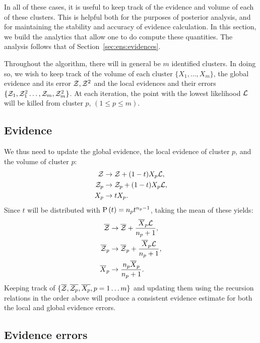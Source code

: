In all of these cases, it is useful to keep track of the evidence and volume of each of these clusters. This is helpful both for the purposes of posterior analysis, and for maintaining the stability and accuracy of evidence calculation. In this section, we build the analytics that allow one to do compute these quantities. The analysis follows that of Section~\ref{sec:ens:evidences}.

Throughout the algorithm, there will in general be \(m\) identified clusters. In doing so, we wish to keep track of the volume of each cluster \(\{X_1,\ldots,X_m\}\), the global evidence and its error \(\mathcal{Z},\mathcal{Z}^2\) and the local evidences and their errors \(\{\mathcal{Z}_1,\mathcal{Z}_1^2\ldots,\mathcal{Z}_m,\mathcal{Z}_m^2\}\). At each iteration, the point with the lowest likelihood \(\mathcal{L}\) will be killed from cluster \(p\), \({(1\le p\le m)}\). 


\subsection{Evidence}
\label{sec:ens:cluster_ev}

We thus need to update the global evidence, the local evidence of cluster \(p\), and the volume of cluster \(p\):
%
\begin{align}
  \mathcal{Z} &\to \mathcal{Z} + (1-t)X_p\mathcal{L},
  \label{eqn:ens:rr_ev}\\
  \mathcal{Z}_p &\to \mathcal{Z}_p + (1-t)X_p\mathcal{L},
  \label{eqn:ens:rr_evi}\\
  X_p &\to t X_p.
  \label{eqn:ens:rr_Xi}
\end{align}
%
Since \(t\) will be distributed with \(\mathrm{P}\left(t\right) = n_p t^{n_p-1}\),
taking the mean of these yields:
%
\begin{align}
  \overline{\mathcal{Z}} &\to \overline{\mathcal{Z}} + \frac{\overline X_p \mathcal{L}}{n_p+1},\\
  \overline{\mathcal{Z}}_p &\to \overline{\mathcal{Z}}_p + \frac{\overline X_p \mathcal{L}}{n_p+1},\\
  \overline X_p &\to \frac{n_p\overline X_p }{n_p+1}. 
\end{align}
%
Keeping track of \(\{\overline{\mathcal{Z}},\overline{\mathcal{Z}_p},\overline{X_p},p=1\ldots m\}\) and updating them using the recursion relations in the order above will produce a consistent evidence estimate for both the local and global evidence errors.


\subsection{Evidence errors}
\label{sec:ens:cluster_err}

